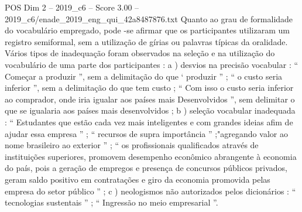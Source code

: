 \begin{textsample}{POS Dim 2 – 2019\_c6 – Score 3.00 – 2019\_c6/enade\_2019\_eng\_qui\_42a8487876.txt}
Quanto ao grau de formalidade do vocabulário empregado, pode -se afirmar que os participantes utilizaram um registro semiformal, sem a utilização de gírias ou palavras típicas da oralidade.
Vários tipos de inadequação foram observados na seleção e na utilização do vocabulário de uma parte dos participantes : a ) desvios na precisão vocabular : “ Começar a produzir ”, sem a delimitação do que ‘ produzir ” ; “ o custo seria inferior ”, sem a delimitação do que tem custo ; “ Com isso o custo seria inferior ao comprador, onde iria igualar aos países mais Desenvolvidos ”, sem delimitar o que se igualaria aos países mais desenvolvidos ; b ) seleção vocabular inadequada : “ Estudantes que estão cada vez mais inteligentes e com grandes ideias afim de ajudar essa empresa ” ; “ recursos de supra importância ” ;"agregando valor ao nome brasileiro ao exterior ” ; “ os profissionais qualificados através de instituições superiores, promovem desempenho econômico abrangente à economia do país, pois a geração de empregos e presença de concursos públicos privados, geram saldo positivo em contratações e giro da economia promovida pelas empresa do setor público ” ; c ) neologismos não autorizados pelos dicionários : “ tecnologias sustentais ” ; “ Ingressão no meio empresarial ”.

\end{textsample}
